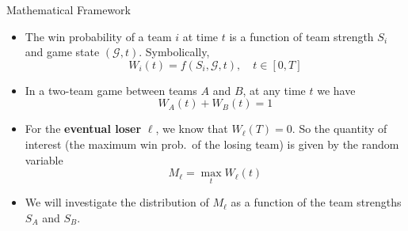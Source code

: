 \documentclass{beamer}
\begin{document}
\begin{frame}{Mathematical Framework}
\begin{itemize}
  \item The win probability of a team $i$ at time $t$ is a function of team strength $S_i$ and game state $(\mathcal{G}, t)$. Symbolically,
  \begin{equation*}
    W_i(t) = f(S_i, \mathcal{G}, t), \quad t \in [0, T]
  \end{equation*}
  \pause
  \item In a two-team game between teams $A$ and $B$, at any time $t$ we have
  \begin{equation*}
    W_A(t) + W_B(t) = 1
  \end{equation*}
  \pause
  \item For the \textbf{eventual loser} $\ell$, we know that $W_\ell(T) = 0$. So the quantity of interest (the maximum win prob.\ of the losing team) is given by the random variable
  \begin{equation*}
    M_\ell = \max_{t} W_\ell(t)
  \end{equation*}
  \pause
  \item We will investigate the distribution of $M_\ell$ as a function of the team strengths $S_A$ and $S_B$.
\end{itemize}
\end{frame}

\end{document}
